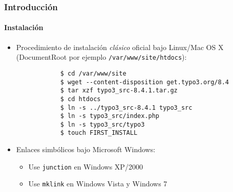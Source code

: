 \begin{frame}[fragile]
	\frametitle{Introducción}
	\framesubtitle{Instalación}

	\begin{itemize}
		\item Procedimiento de instalación \textit{clásico} oficial bajo Linux/Mac OS X\newline
			(DocumentRoot por ejemplo \texttt{/var/www/site/htdocs}):			
		\begin{lstlisting}
			$ cd /var/www/site
			$ wget --content-disposition get.typo3.org/8.4
			$ tar xzf typo3_src-8.4.1.tar.gz
			$ cd htdocs
			$ ln -s ../typo3_src-8.4.1 typo3_src
			$ ln -s typo3_src/index.php
			$ ln -s typo3_src/typo3
			$ touch FIRST_INSTALL
		\end{lstlisting}

		\item Enlaces simbólicos bajo Microsoft Windows:

			\begin{itemize}
				\item Use \texttt{junction} en Windows XP/2000
				\item Use \texttt{mklink} en Windows Vista y Windows 7
			\end{itemize}

	\end{itemize}
\end{frame}

